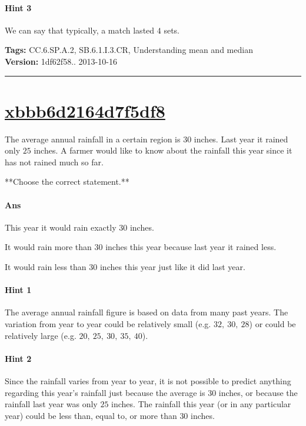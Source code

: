 \documentclass[twocolumn,10pt]{article}
\begin{document}
\paragraph{Hint 3}We can say that typically, a match lasted $4$ sets.



\medskip
\noindent
\textbf{Tags:} {\footnotesize CC.6.SP.A.2, SB.6.1.I.3.CR, Understanding mean and median}\\
\textbf{Version:} 1df62f58.. 2013-10-16
\smallskip\hrule





\section{\href{https://www.khanacademy.org/devadmin/content/items/xbbb6d2164d7f5df8}{xbbb6d2164d7f5df8}}

\noindent
The average annual rainfall in a certain region is $30$ inches.  Last year it rained only $25$ inches.  A farmer would like to know about the rainfall this year since it has not rained much so far.

**Choose the correct statement.**

\paragraph{Ans} 

This year it would rain exactly $30$ inches.

It would rain more than $30$ inches this year because last year it rained less. 

It would rain less than $30$ inches this year just like it did last year.


 

\paragraph{Hint 1}The average annual rainfall figure is based on data from many past years.  The variation from year to year could be relatively small (e.g. $32,~30,~28$) or could be relatively large (e.g. $20,~25,~30,~35,~40$).

\paragraph{Hint 2}Since the rainfall varies from year to year, it is not possible to predict anything regarding this year's rainfall just because the average is $30$ inches, or because the rainfall last year was only $25$ inches. The rainfall this year (or in any particular year) could be less than, equal to, or more than $30$ inches.
\end{document}
